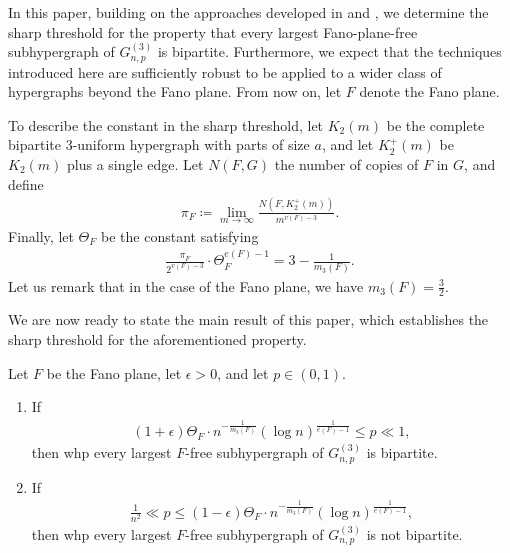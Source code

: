 \documentclass[11pt,a4paper,oneside,reqno]{amsart}
\newcommand{\Gnp}{G_{n, p}^{(3)}}
\newcommand{\1}{\mathbbm{1}} %
\renewcommand{\le}{\leqslant}
\begin{document}
\clearpage
In this paper, building on the approaches developed in \cite{hoshen2023simonovits} and \cite{hoshen2024stabilitylargecutsrandom}, we determine the sharp threshold for the property that every largest Fano-plane-free subhypergraph of $G_{n,p}^{(3)}$ is bipartite. Furthermore, we expect that the techniques introduced here are sufficiently robust to be applied to a wider class of hypergraphs beyond the Fano plane. From now on, let $F$ denote the Fano plane.

To describe the constant in the sharp threshold, let $K_2(m)$ be the complete bipartite $3$-uniform hypergraph with parts of size $a$, and let $K_2^+(m)$ be $K_2(m)$ plus a single edge. Let $N(F, G)$ the number of copies of $F$ in $G$, and define
\begin{align}\label{align:pi_F}
    \pi_F \coloneqq \lim_{m \to \infty} \frac{N\left(F, K_2^+\left(m\right)\right)}{m^{v(F)-3}}.
\end{align}
Finally, let $\Theta_F$ be the constant satisfying
\begin{align}\label{align:pi_F equality}
    \frac{\pi_F}{2^{v(F)-3}} \cdot \Theta_F^{e(F)-1} = 3 - \frac{1}{m_3(F)}.
\end{align}
Let us remark that in the case of the Fano plane, we have $m_3(F) = \frac{3}{2}$.

We are now ready to state the main result of this paper, which establishes the sharp threshold for the aforementioned property.
\begin{thm}\label{thm:main-theorem}
    Let $F$ be the Fano plane, let $\epsilon > 0$, and let $p \in (0, 1)$. 
    \begin{enumerate}[label=(\roman*), ref=\thethm(\roman*), itemsep=0pt, topsep=4pt]
        \item\label{thm:1-statement} If
        \begin{align}\label{align:p definition}
            (1+\epsilon) \Theta_F \cdot n^{-\frac{1}{m_3(F)}} \left(\log n\right)^{\frac{1}{e(F)-1}}  \le p \ll 1,
        \end{align} 
        then whp every largest $F$-free subhypergraph of $\Gnp$ is bipartite.

        \item\label{thm:0-statement} If
        \begin{align}\label{align:p definition 0}
            \frac{1}{n^2} \ll p \le (1-\epsilon) \Theta_F \cdot n^{-\frac{1}{m_3(F)}} \left(\log n\right)^{\frac{1}{e(F)-1}},
        \end{align}     
        then whp every largest $F$-free subhypergraph of $\Gnp$ is not bipartite. 
        \end{enumerate}  
\end{thm}
\end{document}
